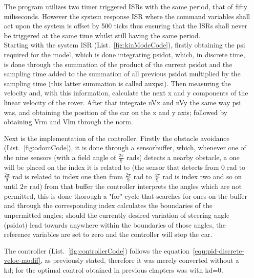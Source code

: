 The program utilizes two timer triggered ISRs with the same period, that of fifty miliseconds. However the system response ISR where the command variables shall act upon the system is offset by 500 ticks thus ensuring that the ISRs shall never be triggered at the same time whilst still having the same period. \\
Starting with the system ISR (List.~\ref{fig:kinModeCode}), firstly obtaining the psi required for the model, which is done integrating psidot, which, in discrete time, is done through the summation of the product of the current psidot and the sampling time added to the summation of all previous psidot multiplied by the sampling time (this latter summation is called aux\textunderscore psi). Then measuring the velocity and, with this information, calculate the next x and y components of the linear velocity of the rover. After that integrate nVx and nVy the same way psi was, and obtaining the position of the car on the x and y axis; followed by obtaining Vr\textunderscore m and Vl\textunderscore m through the norm.

Next is the implementation of the controller. Firstly the obstacle avoidance (List.~\ref{fig:odomCode}), it is done through a sensor\textunderscore buffer, which, whenever one of the nine sensors (with a field angle of $\frac{2\pi}{9}$ rads) detects a nearby obstacle, a one will be placed on the index it is related to (the sensor that detects from 0 rad to  $\frac{2\pi}{9}$ rad is related to index one then from $\frac{2\pi}{9}$ rad to $\frac{4\pi}{9}$ rad is index two and so on until $2\pi$ rad) from that buffer the controller interprets the angles which are not permitted, this is done thorough a "for" cycle that searches for ones on the buffer and through the corresponding index calculates the boundaries of the unpermitted angles; should the currently desired variation of steering angle (psidot) lead towards anywhere within the boundaries of those angles, the reference variables are set to zero and the controller will stop the car.

The controller (List.~\ref{fig:controllerCode}) follows the equation~\ref{equ:pid-discrete-veloc-modif}, as previously stated, therefore it was merely converted without a kd; for the optimal control obtained in previous chapters was with kd=0.
